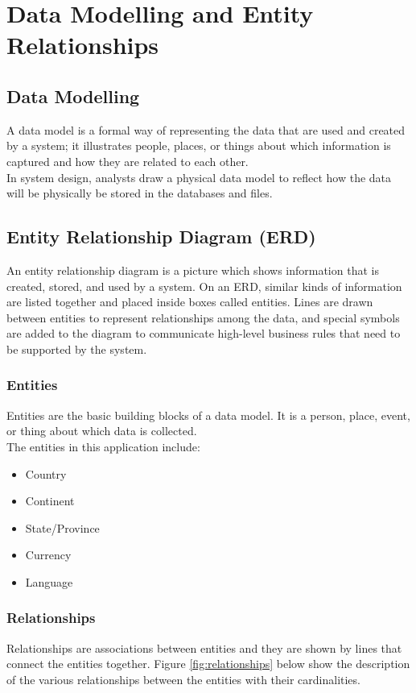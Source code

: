 \documentclass[twoside, a4paper, 12pt]{report}
\begin{document}
\section{Data Modelling and Entity Relationships}
\subsection{Data Modelling}
A data model is a formal way of representing the data that are used and created by a system; it illustrates people, places, or things about which information is captured and how they are related to each other.\\
\indent
In system design, analysts draw a physical data model to reflect how the data will be physically be stored in the databases and files.

\subsection{Entity Relationship Diagram (ERD)}
An entity relationship diagram is a picture which shows information that is created, stored, and used by a system. On an ERD, similar kinds of information are listed together and placed inside boxes called entities. Lines are drawn between entities to represent relationships among the data, and special symbols are added to the diagram to communicate high-level business rules that need to be supported by the system.

\subsubsection{Entities}
Entities are the basic building blocks of a data model. It is a person, place, event, or thing about which data is collected.\\
The entities in this application include:
\begin{itemize}
	\item Country
	\item Continent
	\item State/Province
	\item Currency
	\item Language
\end{itemize}

\subsubsection{Relationships}
Relationships are associations between entities and they are shown by lines that connect the entities together.
Figure \ref{fig:relationships} below show the description of the various relationships between the entities with their cardinalities.
\end{document}
